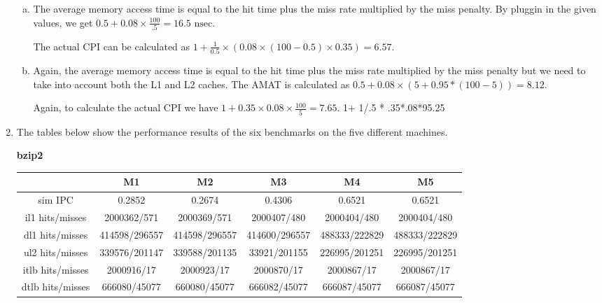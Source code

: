 \documentclass[10pt]{article} %
\begin{document}
\begin{enumerate}
\begin{enumerate}[a)]
\item %

The average memory access time is equal to the hit time plus the miss rate multiplied by the miss penalty.  By pluggin in the given values, we get $0.5 + 0.08 \times \frac{100}{.5} = 16.5 \text{ nsec}$.  

The actual CPI can be calculated as $1 + \frac{1}{0.5} \times (0.08 \times (100 - 0.5) \times 0.35) = 6.57$.  

\item %

Again, the average memory access time is equal to the hit time plus the miss rate multiplied by the miss penalty but we need to take into account both the L1 and L2 caches.  The AMAT is calculated as $0.5 + 0.08 \times (5 + 0.95 * (100 - 5)) = 8.12$.  

Again, to calculate the actual CPI we have $1 + 0.35 \times 0.08 \times \frac{100}{5} = 7.65$.  1+ 1/.5 * .35*.08*95.25

\end{enumerate}

\item %

The tables below show the performance results of the six benchmarks on the five different machines.  

\textbf{bzip2}
\begin{center}
\begin{tabular}{| c | c | c | c | c | c |}
\hline
 & M1 & M2 & M3 & M4 & M5 \\
\hline
sim IPC & 0.2852 & 0.2674 & 0.4306 & 0.6521 & 0.6521 \\
il1 hits/misses & 2000362/571 & 2000369/571 & 2000407/480 & 2000404/480 & 2000404/480 \\
dl1 hits/misses & 414598/296557 & 414598/296557 & 414600/296557 & 488333/222829 & 488333/222829 \\
ul2 hits/misses & 339576/201147 & 339588/201135 & 33921/201155 & 226995/201251 & 226995/201251 \\
itlb hits/misses & 2000916/17 & 2000923/17 & 2000870/17 & 2000867/17 & 2000867/17 \\
dtlb hits/misses & 666080/45077 & 660080/45077 & 666082/45077 & 666087/45077 & 666087/45077 \\
\hline
\end{tabular}
\end{center}


\end{enumerate}
\end{document}
